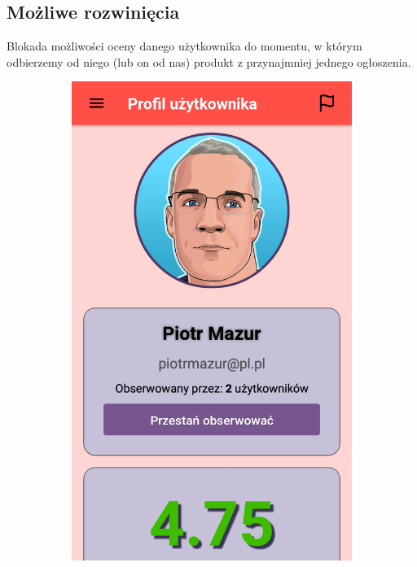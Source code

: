 \documentclass[licencjacka]{pracamgr}
\begin{document}
    \subsection{Możliwe rozwinięcia}
    Blokada możliwości oceny danego użytkownika do momentu, w którym odbierzemy od niego (lub on od nas) produkt z przynajmniej jednego ogłoszenia.

\newpage
\begin{figure}[H]
  \centering

  \begin{subfigure}[b]{0.4\linewidth}
    \begin{framed}
      \includegraphics[width=\linewidth]{profil1.png}

\end{framed}
\end{subfigure}
\end{figure}
\end{document}
